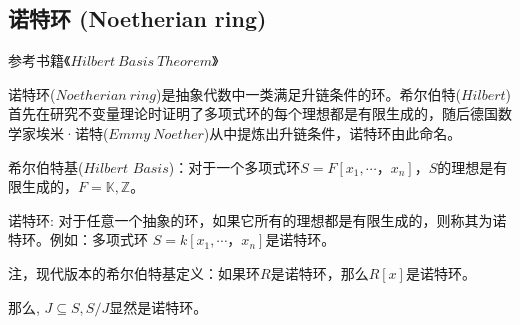 \documentclass[12pt,a4paper]{ctexbook} %
\numberwithin{figure}{section}
\theoremstyle{problemstyle}
\numberwithin{equation}{section} %
\begin{document}
\subsection{ 诺特环 (Noetherian ring)}
参考书籍$《Hilbert \ Basis \ Theorem》$

诺特环($Noetherian \ ring$)是抽象代数中一类满足升链条件的环。希尔伯特($Hilbert$)首先在研究不变量理论时证明了多项式环的每个理想都是有限生成的，随后德国数学家埃米·诺特($Emmy\ Noether$)从中提炼出升链条件，诺特环由此命名。

希尔伯特基($Hilbert$ $Basis $)：对于一个多项式环$S=F[x_{1},\cdots，x_{n}]$，$S$的理想是有限生成的，$F=\mathbb{K,Z}$。

诺特环: 对于任意一个抽象的环，如果它所有的理想都是有限生成的，则称其为诺特环。例如：多项式环
$S=k[x_{1},\cdots，x_{n}]$是诺特环。

注，现代版本的希尔伯特基定义：如果环$R$是诺特环，那么$R[x]$是诺特环。

那么, $J \subseteq S, S/J$显然是诺特环。
\end{document}
